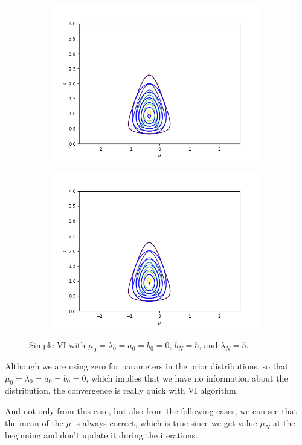 \documentclass[11pt]{extarticle}
\newcommand{\0}{\mathbf{0}}
\renewcommand{\(}{\left(}
\renewcommand{\)}{\right)}
\theoremstyle{definition}
\begin{document}
\begin{enumerate}
\begin{figure}[!ht]
\begin{subfigure}{.45\textwidth}
		\end{subfigure}
		\begin{subfigure}{.45\textwidth}
			\includegraphics[width=\linewidth]{2_4_1_3}
		\end{subfigure}
		\begin{subfigure}{.45\textwidth}
			\includegraphics[width=\linewidth]{2_4_1_6}
		\end{subfigure}
		\caption{Simple VI with $\mu_{0} = \lambda_{0} = a_{0} = b_{0} = 0$, $b_{N} = 5$, and $\lambda_{N} = 5$.}
		\label{fig:2_4_1}
	\end{figure}
	\par Although we are using zero for parameters in the prior distributions, so that $\mu_{0} = \lambda_{0} = a_{0} = b_{0} = 0$, which implies that we have no information about the distribution, the convergence is really quick with VI algorithm.
	\par And not only from this case, but also from the following cases, we can see that the mean of the $\mu$ is always correct, which is true since we get value $\mu_{N}$ at the beginning and don't update it during the iterations.


\end{enumerate}
\end{document}

